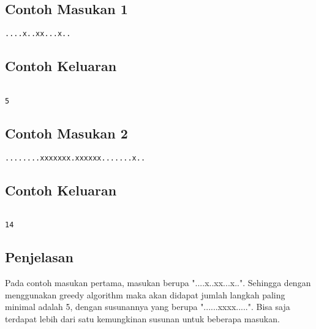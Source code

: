 \documentclass{article}
\begin{document}
\begin{multicols}{2}
\subsection*{Contoh Masukan 1}
\begin{lstlisting}
....x..xx...x..
\end{lstlisting}
\columnbreak
\subsection*{Contoh Keluaran}
\begin{lstlisting}

5
\end{lstlisting}
\vfill
\null
\end{multicols}
\begin{multicols}{2}
\subsection*{Contoh Masukan 2}
\begin{lstlisting}
........xxxxxxx.xxxxxx.......x..
\end{lstlisting}
\columnbreak
\subsection*{Contoh Keluaran}
\begin{lstlisting}

14
\end{lstlisting}
\vfill
\null
\end{multicols}

\subsection*{Penjelasan}
Pada contoh masukan pertama, masukan berupa "....x..xx...x..". Sehingga dengan menggunakan greedy algorithm maka akan didapat jumlah langkah paling minimal adalah 5, dengan susunannya yang berupa "......xxxx.....". Bisa saja terdapat lebih dari satu kemungkinan susunan untuk beberapa masukan.

\pagebreak
\end{document}
